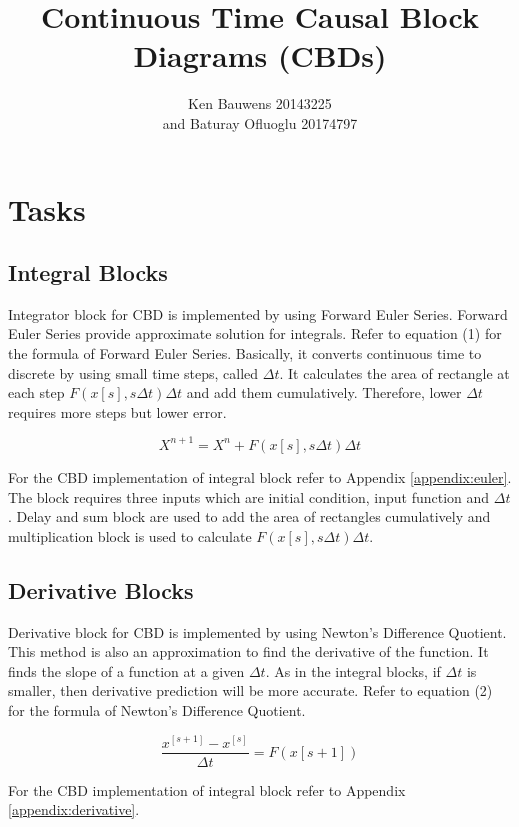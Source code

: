 \documentclass{article}
\title{\vspace{60mm}\textbf{Continuous Time Causal Block Diagrams (CBDs)}}
\author{Ken Bauwens 20143225\\and Baturay Ofluoglu 20174797\\}
\begin{document}
\maketitle
\pagebreak
\section{Tasks}
\subsection{Integral Blocks}

Integrator block for CBD is implemented by using Forward Euler Series. Forward Euler Series provide approximate solution for integrals.  Refer to equation (1) for the formula of Forward Euler Series. Basically, it converts continuous time to discrete by using small time steps, called ${\Delta}t$. It calculates the area of rectangle at each step ${F (x[s] , s\Delta t)\Delta t}$ and add them cumulatively. Therefore, lower ${\Delta}t$ requires more steps but lower error.

\begin{equation}
X^{n+1} = X^n + F (x[s] , s\Delta t)\Delta t
\end{equation}

For the CBD implementation of integral block refer to Appendix \ref{appendix:euler}. The block requires three inputs which are initial condition, input function and ${\Delta}t$. Delay and sum block are used to add the area of rectangles cumulatively and multiplication block is used to calculate  ${F (x[s] , s\Delta t)\Delta t}$. 

\subsection{Derivative Blocks}

Derivative block for CBD is implemented by using Newton’s Difference Quotient. This method is also an approximation to find the derivative of the function. It finds the slope of a function at a given ${\Delta}t$. As in the integral blocks, if ${\Delta}t$ is smaller, then derivative prediction will be more accurate. Refer to equation (2) for the formula of Newton’s Difference Quotient.

\begin{equation}
{\dfrac{x^{[s+1]} - x^{[s]}}{\Delta t }}= F(x[s+1])
\end{equation}

For the CBD implementation of integral block refer to Appendix \ref{appendix:derivative}.
\end{document}
